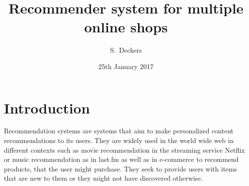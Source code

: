 \documentclass[10pt]{reportMaster}
\title{Recommender system for multiple online shops}
\author{S.\ Deckers}
\date{25th January 2017}
\begin{document}
\maketitle

\tableofcontents

\listoffigures
\listoftables
\listofalgorithms

\chapter{Introduction}
Recommendation systems are systems that aim to make personalized content recommendations to its users.
They are widely used in the world wide web in different contexts such as movie recommendation in the streaming service Netflix or music recommendation as in last.fm as well as in e-commerce to recommend products, that the user might purchase.
They seek to provide users with items that are new to them or they might not have discovered otherwise.
\end{document}
